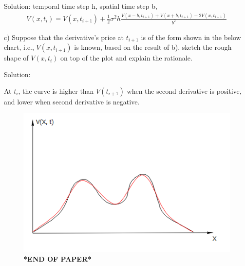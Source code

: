 \documentclass[11pt,a4paper,hidelinks,fleqn]{article}            %
\begin{document}
Solution: temporal time step h, spatial time step b,
\begin{align}
V(x, t_{i}) = V(x, t_{i+1}) +  \frac{1}{2} \sigma^2 h \frac{V(x-b, t_{i+1}) + V(x+b, t_{i+1}) - 2 V(x, t_{i+1})}{b^2}
\end{align}


c) Suppose that the derivative's price at $t_{i+1}$ is of the form shown in the below chart,
i.e., $V(x, t_{i+1})$ is known, based on the result of b),
sketch the rough shape of $V(x, t_{i})$ on top of the plot and explain the rationale.

Solution:

At $t_i$, the curve is higher than $V(t_{i+1})$ when the second derivative is positive, and lower when second derivative is negative.

\begin{figure}[h]
\includegraphics[scale=0.9]{./6s} \\
\vspace{1cm}
\textbf{*END OF PAPER*}
\end{figure}
\end{document}
